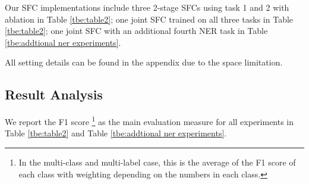Our SFC implementations include three 2-stage SFCs using task 1 and 2 with ablation in Table \ref{tbe:table2}; one joint SFC trained on all three tasks in Table \ref{tbe:table2}; one joint SFC with an additional fourth NER task in Table \ref{tbe:addtional ner experiments}. 

All setting details can be found in the appendix due to the space limitation.

\subsection{Result Analysis}
We report the F1 score \footnote{In the multi-class and multi-label case, this
is the average of the F1 score of each class with weighting depending on the
numbers in each class.} as the main evaluation measure for all experiments in
Table \ref{tbe:table2} and Table \ref{tbe:addtional ner experiments}.

